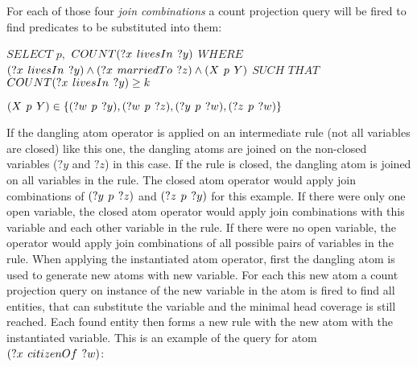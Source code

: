 For each of those four \textit{join combinations} a count projection query will be fired to find predicates to be substituted into them:

$SELECT$ $p,$ $COUNT(?x\hspace{0.4em}livesIn\hspace{0.4em}?y)\\$ 
$WHERE$ $(?x\hspace{0.4em}livesIn\hspace{0.4em}?y) \land (?x\hspace{0.4em}marriedTo\hspace{0.4em}?z) \land (X\hspace{0.4em}p\hspace{0.4em}Y)\\$
$SUCH$ $THAT$ $COUNT(?x\hspace{0.4em}livesIn\hspace{0.4em}?y)\geq k$

$(X\hspace{0.4em}p\hspace{0.4em}Y) \in \{(?w\hspace{0.4em}p\hspace{0.4em}?y),(?w\hspace{0.4em}p\hspace{0.4em}?z),(?y\hspace{0.4em}p\hspace{0.4em}?w),(?z\hspace{0.4em}p\hspace{0.4em}?w)\}$

If the dangling atom operator is applied on an intermediate rule (not all variables are closed) like this one, the dangling atoms are joined on the non-closed variables ($?y$ and $?z$) in this case. If the rule is closed, the dangling atom is joined on all variables in the rule. The closed atom operator would apply join combinations of $(?y\hspace{0.4em}p\hspace{0.4em}?z)$ and $(?z\hspace{0.4em}p\hspace{0.4em}?y)$ for this example. If there were only one open variable, the closed atom operator would apply join combinations with this variable and each other variable in the rule. If there were no open variable, the operator would apply join combinations of all possible pairs of variables in the rule. When applying the instantiated atom operator, first the dangling atom is used to generate new atoms with new variable. For each this new atom a count projection query on instance of the new variable in the atom is fired to find all entities, that can substitute the variable and the minimal head coverage is still reached. Each found entity then forms a new rule with the new atom with the instantiated variable. This is an example of the query for atom $(?x\hspace{0.4em}citizenOf\hspace{0.4em}?w)$:

